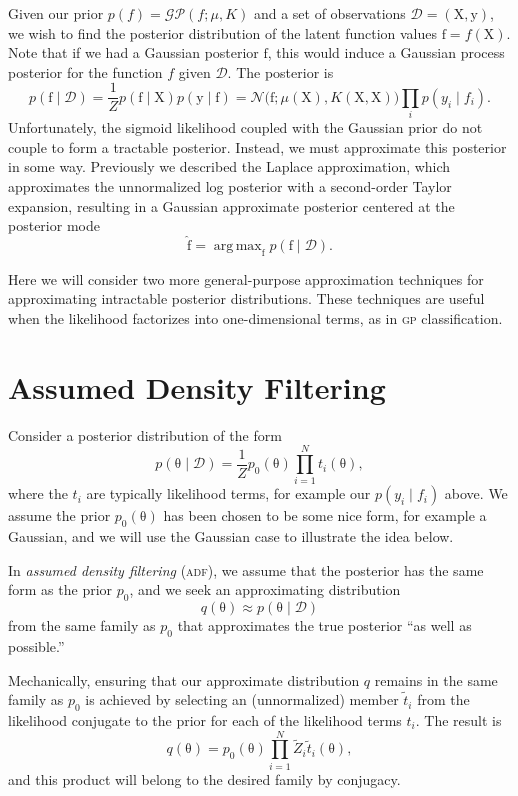 \documentclass{article}
\newcommand{\acro}[1]{\textsc{\MakeLowercase{#1}}}
\newcommand{\given}{\mid}
\newcommand{\mc}[1]{\mathcal{#1}}
\newcommand{\data}{\mc{D}}
\newcommand{\mat}[1]{\bm{\mathrm{#1}}}
\renewcommand{\vec}[1]{\bm{\mathrm{#1}}}
\DeclareMathOperator*{\argmax}{arg\,max}
\begin{document}
Given our prior $p(f) = \mc{GP}(f; \mu, K)$ and a set of observations
$\data = (\mat{X}, \vec{y})$, we wish to find the posterior
distribution of the latent function values $\vec{f} = f(\mat{X})$.
Note that if we had a Gaussian posterior $\vec{f}$, this would induce
a Gaussian process posterior for the function $f$ given $\data$.
The posterior is
\[
  p(\vec{f} \given \data)
  =
  \frac{1}{Z}
  p(\vec{f} \given \mat{X})
  p(\vec{y} \given \vec{f})
  =
  \mc{N}\bigl(\vec{f}; \mu(\mat{X}), K(\mat{X}, \mat{X})\bigr)
  \prod_i p(y_i \given f_i).
\]
Unfortunately, the sigmoid likelihood coupled with the Gaussian prior
do not couple to form a tractable posterior.  Instead, we must
approximate this posterior in some way.  Previously we described the
Laplace approximation, which approximates the unnormalized log
posterior with a second-order Taylor expansion, resulting in a
Gaussian approximate posterior centered at the posterior mode
\[
  \hat{\vec{f}} = \argmax_{\vec{f}} p(\vec{f} \given \data).
\]

Here we will consider two more general-purpose approximation
techniques for approximating intractable posterior distributions.
These techniques are useful when the likelihood factorizes into
one-dimensional terms, as in \acro{GP} classification.

\section*{Assumed Density Filtering}

Consider a posterior distribution of the form
\[
  p(\vec{\theta} \given \data)
  =
  \frac{1}{Z}
  p_0(\vec{\theta})
  \prod_{i = 1}^N
  t_i(\vec{\theta}),
\]
where the $t_i$ are typically likelihood terms, for example our $p(y_i
\given f_i)$ above.  We assume the prior $p_0(\vec{\theta})$ has been
chosen to be some nice form, for example a Gaussian, and we will use
the Gaussian case to illustrate the idea below.

In \emph{assumed density filtering} (\acro{ADF}), we assume that the
posterior has the same form as the prior $p_0$, and we seek an
approximating distribution
\[
  q(\vec{\theta}) \approx p(\vec{\theta} \given \data)
\]
from the same family as $p_0$ that approximates the true posterior
``as well as possible.''

Mechanically, ensuring that our approximate distribution $q$ remains
in the same family as $p_0$ is achieved by selecting an (unnormalized)
member $\tilde{t}_i$ from the likelihood conjugate to the prior for
each of the likelihood terms $t_i$.  The result is
\[
  q(\vec{\theta})
  =
  p_0(\vec{\theta})
  \prod_{i = 1}^N \tilde{Z}_i \tilde{t}_i(\vec{\theta}),
\]
and this product will belong to the desired family by conjugacy.
\end{document}
